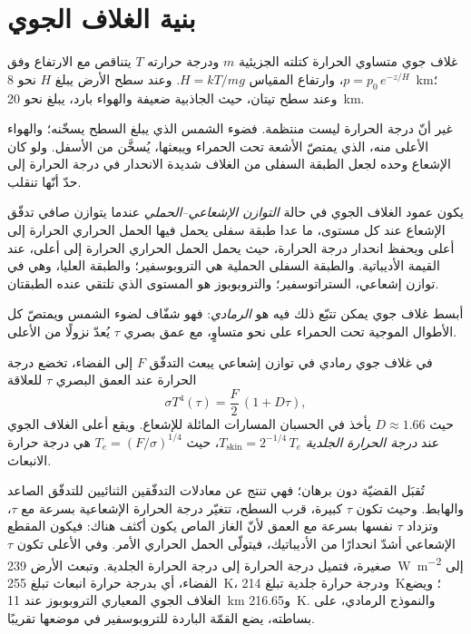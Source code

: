 \section{بنية الغلاف الجوي}\label{sec:b3:planetary-atmospheres:structure}

غلاف جوي متساوي الحرارة كتلته الجزيئية $m$ ودرجة حرارته $T$ يتناقص
مع الارتفاع وفق $p = p_0\,e^{-z/H}$، وارتفاع المقياس $H = kT/mg$. وعند
سطح الأرض يبلغ $H$ نحو \qty{8}{km}؛ وعند سطح تيتان، حيث الجاذبية
ضعيفة والهواء بارد، يبلغ نحو \qty{20}{km}.

غير أنّ درجة الحرارة ليست منتظمة. فضوء الشمس الذي يبلغ السطح
يسخّنه؛ والهواء الأعلى منه، الذي يمتصّ الأشعة تحت الحمراء ويبعثها، يُسخَّن
من الأسفل. ولو كان الإشعاع وحده لجعل الطبقة السفلى من الغلاف شديدة
الانحدار في درجة الحرارة إلى حدّ أنّها تنقلب.

\begin{definition}\label{def:b3:planetary-atmospheres:rce}
يكون عمود الغلاف الجوي في حالة \emph{التوازن الإشعاعي--الحملي} عندما يتوازن
صافي تدفّق الإشعاع عند كل
مستوى، ما عدا طبقة سفلى يحمل فيها الحمل الحراري الحرارة إلى أعلى
ويحفظ انحدار درجة الحرارة، حيث يحمل الحمل الحراري الحرارة إلى أعلى،
عند القيمة الأديباتية. والطبقة السفلى الحملية هي التروبوسفير؛ والطبقة
العليا، وهي في توازن إشعاعي، الستراتوسفير؛ والتروبوبوز هو المستوى
الذي تلتقي عنده الطبقتان.
\end{definition}

أبسط غلاف جوي يمكن تتبّع ذلك فيه هو \emph{الرمادي}: فهو شفّاف لضوء الشمس
ويمتصّ كل الأطوال الموجية تحت الحمراء على نحو متساوٍ،
مع عمق بصري $\tau$ يُعدّ نزولًا من الأعلى.

\begin{proposition}\label{prop:b3:planetary-atmospheres:grey}
في غلاف جوي رمادي في توازن إشعاعي يبعث التدفّق $F$ إلى
الفضاء، تخضع درجة الحرارة عند العمق البصري $\tau$ للعلاقة
\[
\sigma T^4(\tau) = \frac F2\,(1 + D\tau),
\]
حيث $D \approx 1.66$ يأخذ في الحسبان المسارات المائلة للإشعاع.
ويقع أعلى الغلاف الجوي عند \emph{درجة الحرارة الجلدية}
$T_\mathrm{skin} = 2^{-1/4}\,T_e$، حيث $T_e = (F/\sigma)^{1/4}$ هي
درجة حرارة الانبعاث.
\end{proposition}

تُقبَل القضيّة دون برهان؛ فهي تنتج عن معادلات التدفّقين الثنائيين للتدفّق
الصاعد والهابط. وحيث تكون $\tau$ كبيرة، قرب السطح،
تتغيّر درجة الحرارة الإشعاعية بسرعة مع $\tau$، وتزداد $\tau$ نفسها بسرعة
مع العمق لأنّ الغاز الماص يكون أكثف هناك: فيكون المقطع الإشعاعي أشدّ انحدارًا
من الأديباتيك، فيتولّى الحمل الحراري الأمر.
وفي الأعلى تكون $\tau$ صغيرة، فتميل درجة الحرارة إلى درجة
الحرارة الجلدية. وتبعث الأرض \qty{239}{W.m^{-2}} إلى الفضاء، أي بدرجة
حرارة انبعاث تبلغ \qty{255}{K}، ودرجة حرارة جلدية تبلغ
\qty{214}{K}؛ ويضع الغلاف الجوي المعياري التروبوبوز عند \qty{11}{km}
و\qty{216.65}{K}. والنموذج الرمادي، على بساطته، يضع القمّة الباردة
للتروبوسفير في موضعها تقريبًا.

